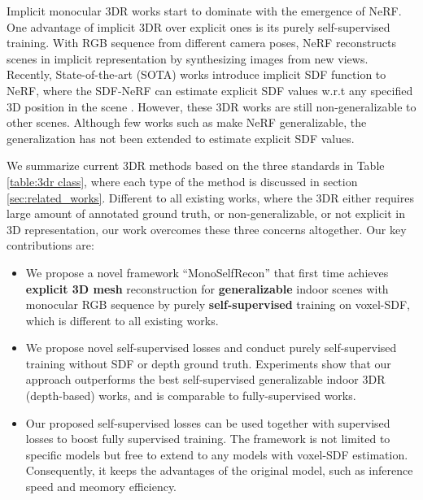 Implicit monocular 3DR works start to dominate with the emergence of NeRF\cite{nerf}. One advantage of implicit 3DR over explicit ones is its purely self-supervised training. With RGB sequence from different camera poses, NeRF reconstructs scenes in implicit representation by synthesizing images from new views. Recently, State-of-the-art (SOTA) works introduce implicit SDF function to NeRF, where the SDF-NeRF can estimate explicit SDF values w.r.t any specified 3D position in the scene \cite{hnerf, isdf, manhattansdf, monosdf, volsdf, neuris}. However, these 3DR works are still non-generalizable to other scenes. Although few works such as \cite{pixelnerf,mpi-nerf} make NeRF generalizable, the generalization has not been extended to estimate explicit SDF values.

We summarize current 3DR methods based on the three standards in Table \ref{table:3dr class}, where each type of the method is discussed in section \ref{sec:related_works}. Different to all existing works, where the 3DR either requires large amount of annotated ground truth, or non-generalizable, or not explicit in 3D representation, our work overcomes these three concerns altogether. Our key contributions are:

\begin{itemize}[leftmargin=0.2cm]
\setlength{\itemsep}{0pt}
\setlength{\parsep}{0pt}
\setlength{\parskip}{0pt}

\item We propose a novel framework ``MonoSelfRecon'' that first time achieves \textbf{explicit 3D mesh} reconstruction for
\textbf{generalizable} indoor scenes with monocular RGB sequence by purely \textbf{self-supervised} training on voxel-SDF, which is different to all existing works.

\item We propose novel self-supervised losses and conduct purely self-supervised training without SDF or depth ground truth. Experiments show that our approach outperforms the best self-supervised generalizable indoor 3DR (depth-based) works, and is comparable to fully-supervised works.

\item Our proposed self-supervised losses can be used together with supervised losses to boost fully supervised training. The framework is not limited to specific models but free to extend to any models with voxel-SDF estimation. Consequently, it keeps the advantages of the original model, such as inference speed and meomory efficiency.

\end{itemize}
